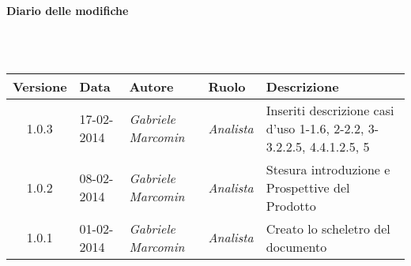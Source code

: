 \noindent\begin{Large}\textbf{Diario delle modifiche}\end{Large}\\
\\
\begin{small}
\begin{tabular}{|c|p{1.8cm}|p{2.8cm}|p{2.8cm}|p{3.5cm}|}
\hline
Versione & Data & Autore & Ruolo & Descrizione \\
\hline
\hline
1.0.3 & 17-02-2014 &
\textit{Gabriele Marcomin} &
\textit{Analista} &  Inseriti descrizione casi d'uso 1-1.6, 2-2.2, 3-3.2.2.5, 4.4.1.2.5, 5\\
\hline
\hline
1.0.2 & 08-02-2014 & 
\textit{Gabriele Marcomin} &
\textit{Analista} &  Stesura introduzione e Prospettive del Prodotto\\
\hline
\hline
1.0.1 & 01-02-2014 &
\textit{Gabriele Marcomin} &
\textit{Analista} &  Creato lo scheletro del documento\\
\hline
\end{tabular}\\
\end{small}